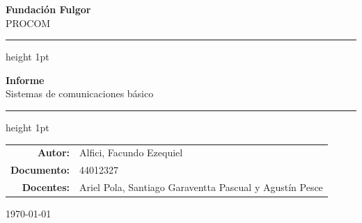 \documentclass[12pt, a4paper]{article}
\newcommand{\tema}{Sistemas de comunicaciones básico}
\newcommand{\titulotrabajo}{Informe}
\newcommand{\autor}{Alfici, Facundo Ezequiel}
\newcommand{\documento}{44012327}
\newcommand{\curso}{PROCOM}
\newcommand{\fundacion}{Fundación Fulgor}
\newcommand{\fecha}{\today}
\begin{document}
\thispagestyle{empty}

\begin{center}   %

    {\Large \textbf{\fundacion}}\\[0.3cm]      %
    {\large \curso}

    \vspace{1.5cm}   %


    \hrule height 1pt   %
    \vspace{0.4cm}

    {\LARGE \textbf{\titulotrabajo}}\\[0.3cm]
    {\large \tema}

    \vspace{0.4cm}
    \hrule height 1pt

    \vspace{2.5cm}

    \begin{tabular}{r l}   %
        \textbf{Autor:}   & \autor\\[0.2cm]
        \textbf{Documento:}  & \documento\\[0.2cm]
        \textbf{Docentes:} &  Ariel Pola, Santiago Garaventta Pascual y Agustín Pesce\\
    \end{tabular}

    \vspace{3cm}

    {\large \fecha}

\end{center}

\newpage

\tableofcontents   %
\newpage
\end{document}
